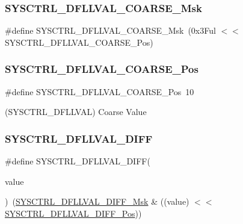 \subsubsection{\texorpdfstring{SYSCTRL\_DFLLVAL\_COARSE\_Msk}{SYSCTRL\_DFLLVAL\_COARSE\_Msk}}
{\footnotesize\ttfamily \#define S\+Y\+S\+C\+T\+R\+L\+\_\+\+D\+F\+L\+L\+V\+A\+L\+\_\+\+C\+O\+A\+R\+S\+E\+\_\+\+Msk~(0x3\+Ful $<$$<$ S\+Y\+S\+C\+T\+R\+L\+\_\+\+D\+F\+L\+L\+V\+A\+L\+\_\+\+C\+O\+A\+R\+S\+E\+\_\+\+Pos)}

\mbox{\label{group___s_a_m_d21___s_y_s_c_t_r_l_ga9c773fb2e30dff5065c2507544d00352}} 
\subsubsection{\texorpdfstring{SYSCTRL\_DFLLVAL\_COARSE\_Pos}{SYSCTRL\_DFLLVAL\_COARSE\_Pos}}
{\footnotesize\ttfamily \#define S\+Y\+S\+C\+T\+R\+L\+\_\+\+D\+F\+L\+L\+V\+A\+L\+\_\+\+C\+O\+A\+R\+S\+E\+\_\+\+Pos~10}



(S\+Y\+S\+C\+T\+R\+L\+\_\+\+D\+F\+L\+L\+V\+AL) Coarse Value 

\mbox{\label{group___s_a_m_d21___s_y_s_c_t_r_l_gac65bd926cbd3b679eda5807f1ee8badd}} 
\subsubsection{\texorpdfstring{SYSCTRL\_DFLLVAL\_DIFF}{SYSCTRL\_DFLLVAL\_DIFF}}
{\footnotesize\ttfamily \#define S\+Y\+S\+C\+T\+R\+L\+\_\+\+D\+F\+L\+L\+V\+A\+L\+\_\+\+D\+I\+FF(\begin{DoxyParamCaption}\item[{}]{value }\end{DoxyParamCaption})~(\mbox{\hyperlink{group___s_a_m_d21___s_y_s_c_t_r_l_ga02c7cefa8690a8b4315bb03130f9d4ab}{S\+Y\+S\+C\+T\+R\+L\+\_\+\+D\+F\+L\+L\+V\+A\+L\+\_\+\+D\+I\+F\+F\+\_\+\+Msk}} \& ((value) $<$$<$ \mbox{\hyperlink{group___s_a_m_d21___s_y_s_c_t_r_l_ga8fe772ac87988d07d1000a26507c147b}{S\+Y\+S\+C\+T\+R\+L\+\_\+\+D\+F\+L\+L\+V\+A\+L\+\_\+\+D\+I\+F\+F\+\_\+\+Pos}}))}

